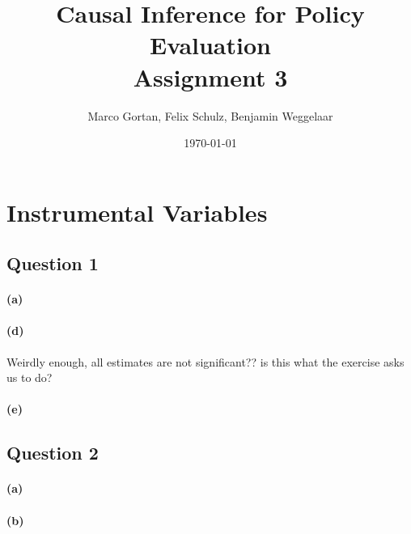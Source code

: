 \documentclass{scrartcl}
\title{Causal Inference for Policy Evaluation\\
\Large{Assignment 3}}
\author{Marco Gortan, Felix Schulz, Benjamin Weggelaar}
\date{\today}
\begin{document}
\maketitle

\section*{Instrumental Variables}

\subsection*{Question 1}

\paragraph*{(a)}





\paragraph*{(d)}

Weirdly enough, all estimates are not significant?? is this what the exercise asks us to do?

\paragraph*{(e)}

\subsection*{Question 2}

\paragraph*{(a)}



\paragraph*{(b)}
\end{document}
